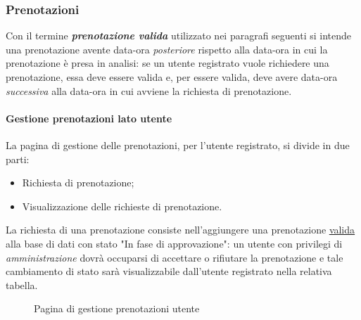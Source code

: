 \documentclass{article}
\begin{document}
\subsubsection{Prenotazioni}
\label{prenotazioni:valida}
Con il termine \textbf{\textit{prenotazione valida}} utilizzato nei paragrafi seguenti si intende una prenotazione avente data-ora \textit{posteriore} rispetto alla data-ora in cui la prenotazione è presa in analisi: se un utente registrato vuole richiedere una prenotazione, essa deve essere valida e, per essere valida, deve avere data-ora \textit{successiva} alla data-ora in cui avviene la richiesta di prenotazione.

\paragraph*{Gestione prenotazioni lato utente}
La pagina di gestione delle prenotazioni, per l'utente registrato, si divide in due parti:
\begin{itemize}
	\item Richiesta di prenotazione;
	\item Visualizzazione delle richieste di prenotazione.
\end{itemize}
La richiesta di una prenotazione consiste nell'aggiungere una prenotazione \hyperref[prenotazioni:valida]{\underline{valida}} alla base di dati con stato "In fase di approvazione": un utente con privilegi di \textit{amministrazione} dovrà occuparsi di accettare o rifiutare la prenotazione e tale cambiamento di stato sarà visualizzabile dall'utente registrato nella relativa tabella.
\begin{figure}[H]
	\centering
	\caption{Pagina di gestione prenotazioni utente}
\end{figure}
\end{document}
